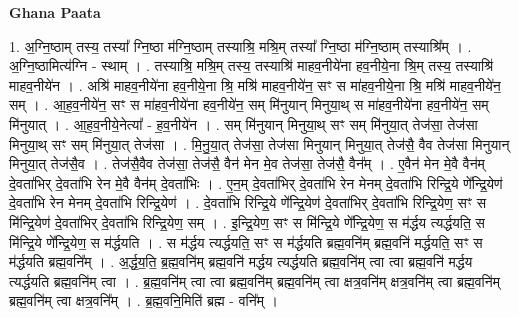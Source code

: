 \documentclass[17pt]{extarticle}
\begin{document}
\textbf{Ghana Paata } \newline

1. अ॒ग्नि॒ष्ठाम् तस्य॒ तस्या᳚ ग्नि॒ष्ठा म॑ग्नि॒ष्ठाम् तस्याश्रि॒ मश्रि॒म् तस्या᳚ ग्नि॒ष्ठा म॑ग्नि॒ष्ठाम् तस्याश्रि᳚म् । . अ॒ग्नि॒ष्ठामित्य॑ग्नि - स्थाम् । . तस्याश्रि॒ मश्रि॒म् तस्य॒ तस्याश्रि॑ माहव॒नीये॑ना हव॒नीये॒ना श्रि॒म् तस्य॒ तस्याश्रि॑ माहव॒नीये॑न । . अश्रि॑ माहव॒नीये॑ना हव॒नीये॒ना श्रि॒ मश्रि॑ माहव॒नीये॑न॒ सꣳ स मा॑हव॒नीये॒ना श्रि॒ मश्रि॑ माहव॒नीये॑न॒ सम् । . आ॒ह॒व॒नीये॑न॒ सꣳ स मा॑हव॒नीये॑ना हव॒नीये॑न॒ सम् मि॑नुयान् मिनुया॒थ् स मा॑हव॒नीये॑ना हव॒नीये॑न॒ सम् मि॑नुयात् । . आ॒ह॒व॒नीये॒नेत्या᳚ - ह॒व॒नीये॑न । . सम् मि॑नुयान् मिनुया॒थ् सꣳ सम् मि॑नुया॒त् तेज॑सा॒ तेज॑सा मिनुया॒थ् सꣳ सम् मि॑नुया॒त् तेज॑सा । . मि॒नु॒या॒त् तेज॑सा॒ तेज॑सा मिनुयान् मिनुया॒त् तेज॑सै॒ वैव तेज॑सा मिनुयान् मिनुया॒त् तेज॑सै॒व । . तेज॑सै॒वैव तेज॑सा॒ तेज॑सै॒ वैन॑ मेन मे॒व तेज॑सा॒ तेज॑सै॒ वैन᳚म् । . ए॒वैन॑ मेन मे॒वै वैन॑म् दे॒वता॑भिर् दे॒वता॑भि रेन मे॒वै वैन॑म् दे॒वता॑भिः । . ए॒न॒म् दे॒वता॑भिर् दे॒वता॑भि रेन मेनम् दे॒वता॑भि रिन्द्रि॒ये णे᳚न्द्रि॒येण॑ दे॒वता॑भि रेन मेनम् दे॒वता॑भि रिन्द्रि॒येण॑ । . दे॒वता॑भि रिन्द्रि॒ये णे᳚न्द्रि॒येण॑ दे॒वता॑भिर् दे॒वता॑भि रिन्द्रि॒येण॒ सꣳ स मि॑न्द्रि॒येण॑ दे॒वता॑भिर् दे॒वता॑भि रिन्द्रि॒येण॒ सम् । . इ॒न्द्रि॒येण॒ सꣳ स मि॑न्द्रि॒ये णे᳚न्द्रि॒येण॒ स म॑र्द्धय त्यर्द्धयति॒ स मि॑न्द्रि॒ये णे᳚न्द्रि॒येण॒ स म॑र्द्धयति । . स म॑र्द्धय त्यर्द्धयति॒ सꣳ स म॑र्द्धयति ब्रह्म॒वनि॑म् ब्रह्म॒वनि॑ मर्द्धयति॒ सꣳ स म॑र्द्धयति ब्रह्म॒वनि᳚म् । . अ॒र्द्ध॒य॒ति॒ ब्र॒ह्म॒वनि॑म् ब्रह्म॒वनि॑ मर्द्धय त्यर्द्धयति ब्रह्म॒वनि॑म् त्वा त्वा ब्रह्म॒वनि॑ मर्द्धय त्यर्द्धयति ब्रह्म॒वनि॑म् त्वा । . ब्र॒ह्म॒वनि॑म् त्वा त्वा ब्रह्म॒वनि॑म् ब्रह्म॒वनि॑म् त्वा क्षत्र॒वनि॑म् क्षत्र॒वनि॑म् त्वा ब्रह्म॒वनि॑म् ब्रह्म॒वनि॑म् त्वा क्षत्र॒वनि᳚म् । . ब्र॒ह्म॒वनि॒मिति॑ ब्रह्म - वनि᳚म् । \newline
\end{document}
